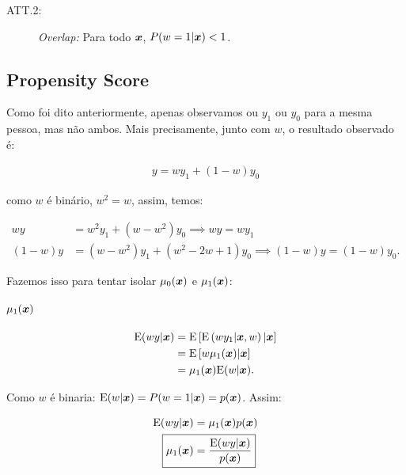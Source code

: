 \documentclass[11pt, oneside, a4paper, article]{article}
\numberwithin{equation}{section}
\begin{document}
\begin{description}
\begin{description}
	\item[ATT.2:] \textit{Overlap:} Para todo $\boldsymbol{x}$, $P(w=1 | \boldsymbol{x} ) < 1$.
\end{description}

\subsection{Propensity Score}

Como foi dito anteriormente, apenas observamos ou $y_{1}$ ou $y_{0}$ para a mesma pessoa, mas não ambos.
Mais precisamente, junto com $w$, o resultado observado é:

\vspace{-1 em}
\begin{align*}
	y = wy_{1} + (1 - w) y_{0}
\end{align*}

\noindent
como  $w$ é binário, $w^2 = w$, assim, temos:

\vspace{-1 em}
\begin{align*}
	w y &= w^{2} y_{1} + (w - w^{2}) y_{0}
	\implies
	\boxed{w y = w y_{1} }
	\\
	( 1 - w ) y &= (w - w^{2}) y_{1} + ( w^{2} - 2w + 1 ) y_{0}
	\implies
	\boxed{( 1 - w ) y = (1 - w) y_{0}}.
\end{align*}

Fazemos isso para tentar isolar $\mu_{0}(\boldsymbol{x})$ e $\mu_{1}(\boldsymbol{x})$:

\paragraph{$\mu_{1}( \boldsymbol{x} )$}

\begin{align*}
	\text{E}( w y | \boldsymbol{x} ) &= \text{E}\left[  \text{E} \left( w y_{1} | \boldsymbol{x}, w  \right) | \boldsymbol{x} \right]
	\\ &=
	\text{E} \left[ w \mu_{1}(\boldsymbol{x}) | \boldsymbol{x} \right]
	\\ &=
	\mu_{1}(\boldsymbol{x}) \text{E}(w | \boldsymbol{x} ).
\end{align*}

\noindent
Como $w$ é binaria: $\text{E}(w| \boldsymbol{x}) = P(w=1 | \boldsymbol{x}) = p(\boldsymbol{x})$.
Assim:

\vspace{-1 em}
\begin{align*}
	\E( w y | \xvec ) &= \mu_{1}(\xvec) p(\xvec)
	\\
	\Aboxed{ \mu_{1}(\xvec) &= \frac{\E(w y | \xvec)}{p(\xvec)} }
\end{align*}


\end{description}
\end{document}
